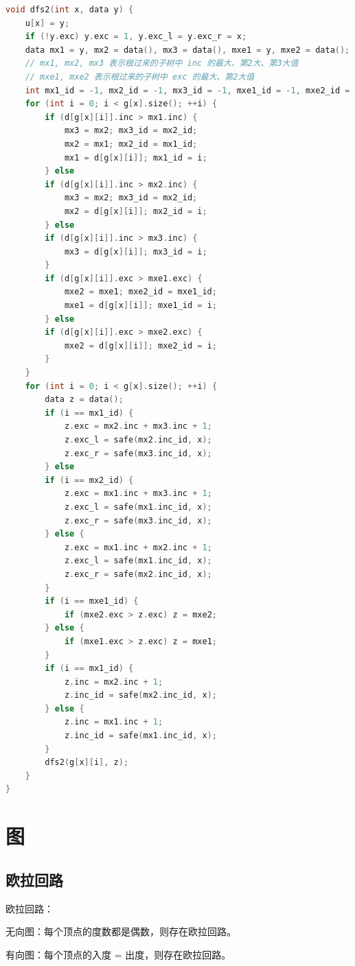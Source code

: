 \documentclass{article}
\begin{document}
\begin{lstlisting}[language=C++]
void dfs2(int x, data y) {
    u[x] = y;
    if (!y.exc) y.exc = 1, y.exc_l = y.exc_r = x;
    data mx1 = y, mx2 = data(), mx3 = data(), mxe1 = y, mxe2 = data();
    // mx1, mx2, mx3 表示根过来的子树中 inc 的最大、第2大、第3大值
    // mxe1, mxe2 表示根过来的子树中 exc 的最大、第2大值
    int mx1_id = -1, mx2_id = -1, mx3_id = -1, mxe1_id = -1, mxe2_id = -1;
    for (int i = 0; i < g[x].size(); ++i) {
        if (d[g[x][i]].inc > mx1.inc) {
            mx3 = mx2; mx3_id = mx2_id;
            mx2 = mx1; mx2_id = mx1_id;
            mx1 = d[g[x][i]]; mx1_id = i;
        } else
        if (d[g[x][i]].inc > mx2.inc) {
            mx3 = mx2; mx3_id = mx2_id;
            mx2 = d[g[x][i]]; mx2_id = i;
        } else
        if (d[g[x][i]].inc > mx3.inc) {
            mx3 = d[g[x][i]]; mx3_id = i;
        }
        if (d[g[x][i]].exc > mxe1.exc) {
            mxe2 = mxe1; mxe2_id = mxe1_id;
            mxe1 = d[g[x][i]]; mxe1_id = i;
        } else
        if (d[g[x][i]].exc > mxe2.exc) {
            mxe2 = d[g[x][i]]; mxe2_id = i;
        }
    }
    for (int i = 0; i < g[x].size(); ++i) {
        data z = data();
        if (i == mx1_id) {
            z.exc = mx2.inc + mx3.inc + 1;
            z.exc_l = safe(mx2.inc_id, x);
            z.exc_r = safe(mx3.inc_id, x);
        } else
        if (i == mx2_id) {
            z.exc = mx1.inc + mx3.inc + 1;
            z.exc_l = safe(mx1.inc_id, x);
            z.exc_r = safe(mx3.inc_id, x);
        } else {
            z.exc = mx1.inc + mx2.inc + 1;
            z.exc_l = safe(mx1.inc_id, x);
            z.exc_r = safe(mx2.inc_id, x);
        }
        if (i == mxe1_id) {
            if (mxe2.exc > z.exc) z = mxe2;
        } else {
            if (mxe1.exc > z.exc) z = mxe1;
        }
        if (i == mx1_id) {
            z.inc = mx2.inc + 1;
            z.inc_id = safe(mx2.inc_id, x);
        } else {
            z.inc = mx1.inc + 1;
            z.inc_id = safe(mx1.inc_id, x);
        }
        dfs2(g[x][i], z);
    }
}
\end{lstlisting}

\section{图}
\subsection{欧拉回路}
欧拉回路： 

无向图：每个顶点的度数都是偶数，则存在欧拉回路。 

有向图：每个顶点的入度 = 出度，则存在欧拉回路。 
\end{document}
